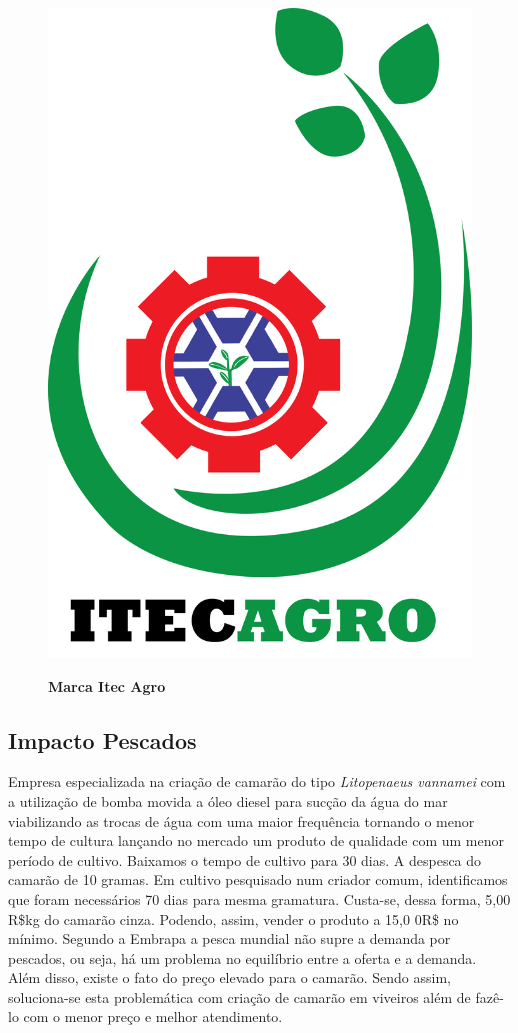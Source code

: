 \begin{figure}[!htb]
\centering
\caption{\textbf{Marca Itec Agro}}
\includegraphics[scale=0.15]{Imagens/itecagro.png}
\label{figura_46}
\end{figure}
\newpage

\subsection{Impacto Pescados}

Empresa especializada na criação de camarão do tipo \textit{Litopenaeus vannamei} com a utilização de bomba movida a óleo diesel para sucção da água do mar viabilizando as trocas de água com uma maior frequência tornando o menor tempo de cultura lançando no mercado um produto de qualidade com um menor período de cultivo. Baixamos o tempo de cultivo para 30 dias. A despesca do camarão de 10 gramas. Em cultivo pesquisado num criador comum, identificamos que foram necessários 70 dias para mesma gramatura. Custa-se, dessa forma, 5,00 R\$kg do camarão cinza. Podendo, assim, vender o produto a 15,0 0R\$ no mínimo. Segundo a Embrapa a pesca mundial não supre a demanda por pescados, ou seja, há um problema no equilíbrio entre a oferta e a demanda. Além disso, existe o fato do preço elevado para o camarão. Sendo assim, soluciona-se esta problemática com criação de camarão em viveiros além de fazê-lo com o menor preço e melhor atendimento.

